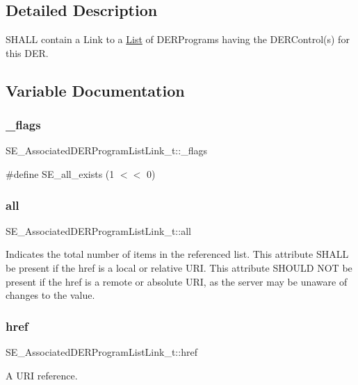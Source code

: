 \subsection{Detailed Description}
S\+H\+A\+LL contain a Link to a \hyperlink{structList}{List} of D\+E\+R\+Programs having the D\+E\+R\+Control(s) for this D\+ER. 

\subsection{Variable Documentation}
\mbox{\label{group__AssociatedDERProgramListLink_ga9b18cb252039dc6e31f30c98082c817f}} 
\subsubsection{\texorpdfstring{\+\_\+flags}{\_flags}}
{\footnotesize\ttfamily S\+E\+\_\+\+Associated\+D\+E\+R\+Program\+List\+Link\+\_\+t\+::\+\_\+flags}

\#define S\+E\+\_\+all\+\_\+exists (1 $<$$<$ 0) \mbox{\label{group__AssociatedDERProgramListLink_gaa873f04f67391ceb7ce2c75b236c85d4}} 
\subsubsection{\texorpdfstring{all}{all}}
{\footnotesize\ttfamily S\+E\+\_\+\+Associated\+D\+E\+R\+Program\+List\+Link\+\_\+t\+::all}

Indicates the total number of items in the referenced list. This attribute S\+H\+A\+LL be present if the href is a local or relative U\+RI. This attribute S\+H\+O\+U\+LD N\+OT be present if the href is a remote or absolute U\+RI, as the server may be unaware of changes to the value. \mbox{\label{group__AssociatedDERProgramListLink_ga0e6c12c3f2c05116497088b00af2e087}} 
\subsubsection{\texorpdfstring{href}{href}}
{\footnotesize\ttfamily S\+E\+\_\+\+Associated\+D\+E\+R\+Program\+List\+Link\+\_\+t\+::href}

A U\+RI reference. 